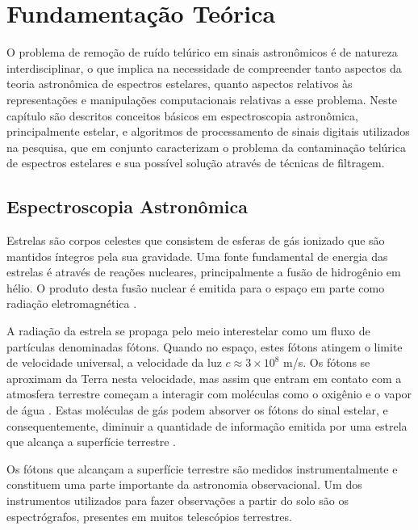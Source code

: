 \chapter{Fundamentação Teórica}
\label{cap:fundamentacao-teorica}

O problema de remoção de ruído telúrico em sinais astronômicos é de natureza interdisciplinar, o que implica na necessidade de compreender tanto aspectos da teoria astronômica de espectros estelares, quanto aspectos relativos às representações e manipulações computacionais relativas a esse problema.
Neste capítulo são descritos conceitos básicos em espectroscopia astronômica, principalmente estelar, e algoritmos de processamento de sinais digitais utilizados na pesquisa, que em conjunto caracterizam o problema da contaminação telúrica de espectros estelares e sua possível solução através de técnicas de filtragem.

\section{Espectroscopia Astronômica} \label{astronomic-spectroscopy}

Estrelas são corpos celestes que consistem de esferas de gás ionizado que são mantidos íntegros pela sua gravidade. Uma fonte fundamental de energia das estrelas é através de reações nucleares, principalmente a fusão de hidrogênio em hélio. O produto desta fusão nuclear é emitida para o espaço em parte como radiação eletromagnética \citep{estrelas-ufrgs}.   

A radiação da estrela se propaga pelo meio interestelar como um fluxo de partículas denominadas fótons. Quando no espaço, estes fótons atingem o limite de velocidade universal, a velocidade da luz $\textit{c} \approx 3 \times 10^8$ m/s. Os fótons se aproximam da Terra nesta velocidade, mas assim que entram em contato com a atmosfera terrestre começam a interagir com moléculas como o oxigênio e o vapor de água \citep{wiki:photon}. Estas moléculas de gás podem absorver os fótons do sinal estelar, e consequentemente, diminuir a quantidade de informação emitida por uma estrela que alcança a superfície terrestre \citep{wiki:telluric-contamination}.

Os fótons que alcançam a superfície terrestre são medidos instrumentalmente e constituem uma parte importante da astronomia observacional. Um dos instrumentos utilizados para fazer observações a partir do solo são os espectrógrafos, presentes em muitos telescópios terrestres. 

